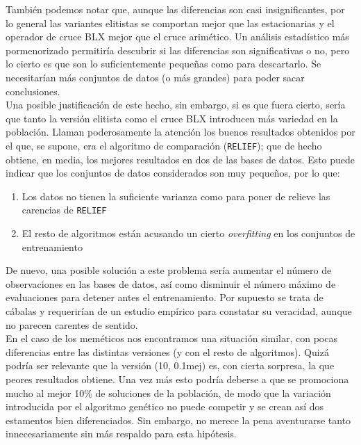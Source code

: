 \documentclass[11pt]{article}
\theoremstyle{plain}
\theoremstyle{definition}
\begin{document}
También podemos notar que, aunque las diferencias son casi insignificantes, por lo general las variantes elitistas se comportan mejor que las estacionarias y el operador de cruce BLX mejor que el cruce arimético. Un análisis estadístico más pormenorizado permitiría descubrir si las diferencias son significativas o no, pero lo cierto es que son lo suficientemente pequeñas como para descartarlo. Se necesitarían más conjuntos de datos (o más grandes) para poder sacar conclusiones. \\

Una posible justificación de este hecho, sin embargo, si es que fuera cierto, sería que tanto la versión elitista como el cruce BLX introducen más variedad en la población. Llaman poderosamente la atención los buenos resultados obtenidos por el que, se supone, era el algoritmo de comparación (\texttt{RELIEF}); que de hecho obtiene, en media, los mejores resultados en dos de las bases de datos. Esto puede indicar que los conjuntos de datos considerados son muy pequeños, por lo que:

\begin{enumerate}
\item Los datos no tienen la suficiente varianza como para poner de relieve las carencias de \texttt{RELIEF}
\item El resto de algoritmos están acusando un cierto \textit{overfitting} en los conjuntos de entrenamiento
\end{enumerate}

De nuevo, una posible solución a este problema sería aumentar el número de observaciones en las bases de datos, así como disminuir el número máximo de evaluaciones para detener antes el entrenamiento. Por supuesto se trata de cábalas y requerirían de un estudio empírico para constatar su veracidad, aunque no parecen carentes de sentido. \\

En el caso de los meméticos nos encontramos una situación similar, con pocas diferencias entre las distintas versiones (y con el resto de algoritmos). Quizá podría ser relevante que la versión (10, 0.1mej) es, con cierta sorpresa, la que peores resultados obtiene. Una vez más esto podría deberse a que se promociona mucho al mejor 10\% de soluciones de la población, de modo que la variación introducida por el algoritmo genético no puede competir y se crean así dos estamentos bien diferenciados. Sin embargo, no merece la pena aventurarse tanto innecesariamente sin más respaldo para esta hipótesis. \\
\end{document}

